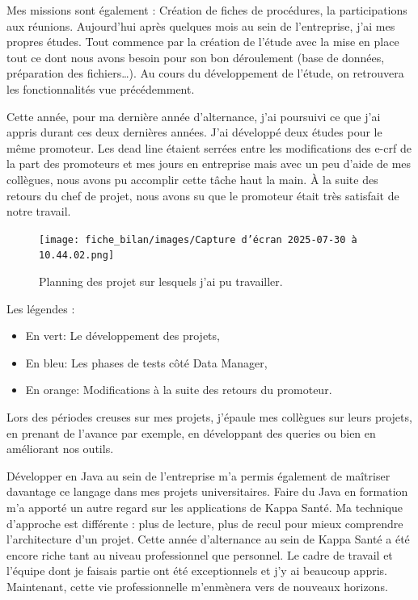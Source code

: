 Mes missions sont également : Création de fiches de procédures, la participations aux réunions. 
Aujourd’hui après quelques mois au sein de l’entreprise, j’ai mes propres études. Tout commence par la création de l’étude avec la mise en place tout ce dont nous avons besoin pour son bon déroulement (base de données, préparation des fichiers…). Au
cours du développement de l’étude, on retrouvera les fonctionnalités vue précédemment.
\vspace{0.5cm}

Cette année, pour ma dernière année d'alternance, j'ai poursuivi ce que j'ai appris durant ces deux dernières années. J'ai développé deux études pour le même promoteur. Les dead line étaient serrées entre les modifications des e-crf de la part des promoteurs et mes jours en entreprise mais avec un peu d'aide de mes collègues, nous avons pu accomplir cette tâche haut la main. À la suite des retours du chef de projet, nous avons su que le promoteur était très satisfait de notre travail. 
\begin{figure}[H]
    \centering
    \texttt{[image: fiche\_bilan/images/Capture d’écran 2025-07-30 à 10.44.02.png]} 
    \caption{Planning des projet sur lesquels j'ai pu travailler.}
\end{figure}
Les légendes :
\begin{itemize}
    \item En vert: Le développement des projets,
    \item En bleu: Les phases de tests côté Data Manager,
    \item En orange: Modifications à la suite des retours du promoteur.
\end{itemize}

Lors des périodes creuses sur mes projets, j'épaule mes collègues sur leurs projets, en prenant de l'avance par exemple, en développant des queries ou bien en améliorant nos outils.

\vspace{0.5cm}
Développer en Java au sein de l’entreprise m’a permis également de maîtriser davantage ce langage dans mes projets universitaires. Faire du Java en formation m’a apporté un autre regard sur les applications de Kappa Santé. Ma technique d’approche est différente : plus de lecture, plus de recul pour mieux comprendre l’architecture d’un projet. 
Cette année d’alternance au sein de Kappa Santé a été encore riche tant au niveau professionnel que personnel.
Le cadre de travail et l’équipe dont je faisais partie ont été exceptionnels et j’y ai beaucoup appris. Maintenant, cette vie professionnelle m'enmènera vers de nouveaux horizons.
